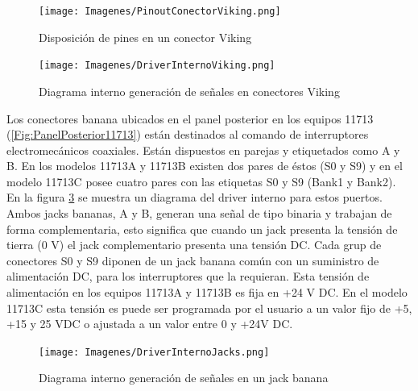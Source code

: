 \begin{figure}
	\centering
	\begin{minipage}{17.268cm}
		\texttt{[image: Imagenes/PinoutConectorViking.png]}
		\caption{Disposición de pines en un conector Viking}
		\label{Fig:PinoutConectorViking}
	\end{minipage}
\end{figure}		

\begin{figure}
	\centering
	\begin{minipage}{17.214cm}
		\texttt{[image: Imagenes/DriverInternoViking.png]} 
		\caption{Diagrama interno generación de señales en conectores Viking}
		\label{Fig:DriverInternoViking}				
	\end{minipage}
\end{figure}

Los conectores banana ubicados en el panel posterior en los equipos 11713 (\ref{Fig:PanelPosterior11713}) están destinados al comando de interruptores electromecánicos coaxiales. Están dispuestos en parejas y etiquetados como A y B. En los modelos 11713A	y 11713B existen dos pares de éstos (S0 y S9) y en el modelo 11713C posee cuatro pares con las etiquetas S0 y S9 (Bank1 y Bank2). En la figura \ref{Fig:DriverInternoBanana} se muestra un diagrama del driver interno para estos puertos. Ambos jacks bananas, A y B, generan una señal de tipo binaria y trabajan de forma complementaria, esto significa que cuando un jack presenta la tensión de tierra (0 V) el jack complementario presenta una tensión DC. Cada grup de conectores S0 y S9 diponen de un jack banana común con un suministro de alimentación DC, para los interruptores que la requieran. Esta tensión de alimentación en los equipos 11713A y 11713B es fija en +24 V DC. En el modelo 11713C esta tensión es puede ser programada por el usuario a un valor fijo de +5, +15 y 25 VDC o ajustada a un valor entre 0 y +24V DC.

\begin{figure}
	\centering
	\begin{minipage}{17.404cm}
		\texttt{[image: Imagenes/DriverInternoJacks.png]}
		\caption{Diagrama interno generación de señales en un jack banana}
		\label{Fig:DriverInternoBanana}				
	\end{minipage}
\end{figure}

